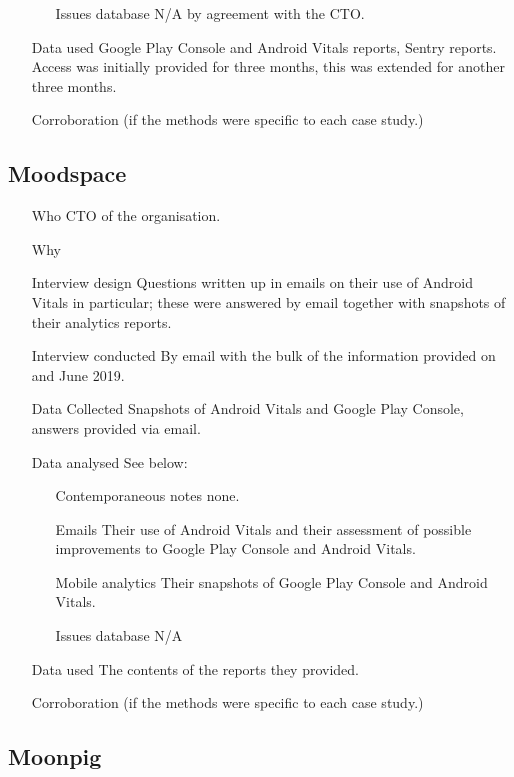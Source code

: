\begin{itemize}
\begin{itemize}
        \item[Issues database] N/A by agreement with the CTO.
    \end{itemize}
    \item[Data used] Google Play Console and Android Vitals reports, Sentry reports. Access was initially provided for three months, this was extended for another three months. 
    \item[Corroboration] (if the methods were specific to each case study.) 
\end{itemize}

\subsection{Moodspace}

\begin{itemize}
    \item[Who] CTO of the organisation.
    \item[Why]
    \item[Interview design] Questions written up in emails on their use of Android Vitals in particular; these were answered by email together with snapshots of their analytics reports.
    \item[Interview conducted] By email with the bulk of the information provided on  and  June 2019.
    \item[Data Collected] Snapshots of Android Vitals and Google Play Console, answers provided via email.
    \item[Data analysed] See below:
    \begin{itemize}
        \item[Contemporaneous notes]  none.
        \item[Emails] Their use of Android Vitals and their assessment of possible improvements to Google Play Console and Android Vitals.
        \item[Mobile analytics] Their snapshots of Google Play Console and Android Vitals.
        \item[Issues database] N/A
    \end{itemize}
    \item[Data used] The contents of the reports they provided.
    \item[Corroboration] (if the methods were specific to each case study.) 
\end{itemize}

\subsection{Moonpig}

